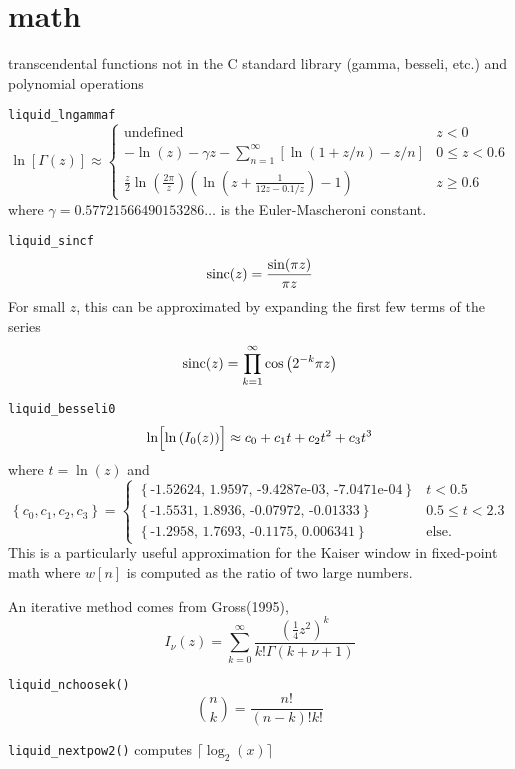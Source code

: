 % 
%

\section{math}
\label{module:math}
transcendental functions not in the C standard library (gamma, besseli, etc.)
and polynomial operations

{\tt liquid\_lngammaf}
\[
    \ln\left[ \Gamma(z) \right] \approx
    \begin{cases}
        \text{undefined}
        & z < 0 \\
        -\ln(z) - \gamma z - \sum_{n=1}^{\infty} {
            \left[ \ln(1 + z/n) -z/n\right]
        }
        & 0 \le z < 0.6 \\
        \frac{z}{2} \ln\left( \frac{2\pi}{z} \right)
        \left(
            \ln\left(z + \frac{1}{12 z - 0.1/z} \right) - 1
        \right)
        & z \ge 0.6
    \end{cases}
\]
where $\gamma=0.57721566490153286\ldots$ is the Euler-Mascheroni constant.

{\tt liquid\_sincf}
\[ \textup{sinc}(z) = \frac{\sin(\pi z)}{\pi z} \]
For small $z$, this can be approximated by expanding the first few terms of
the series
\[
    \textup{sinc}(z) = \prod_{k=1}^{\infty}{ \cos\left( 2^{-k} \pi z \right) }
\]

{\tt liquid\_besseli0}
\[
    \ln\Bigl[\ln\left(I_0(z)\right)\Bigr] \approx
    c_0 + c_1 t + c_2 t ^2 + c_3 t^3
\]
where $t=\ln(z)$ and
\[
    \left\{c_0,c_1,c_2,c_3\right\} =
    \begin{cases}
    \left\{\text{-1.52624, 1.9597, -9.4287e-03, -7.0471e-04}\right\} & t < 0.5 \\
    \left\{\text{-1.5531, 1.8936, -0.07972, -0.01333}\right\} & 0.5 \le t < 2.3 \\
    \left\{\text{-1.2958, 1.7693, -0.1175, 0.006341}\right\} & \text{else}.
    \end{cases}
\]
This is a particularly useful approximation for the Kaiser window in
fixed-point math where $w[n]$ is computed as the ratio of two large numbers.

An iterative method comes from Gross(1995),
\[
    I_\nu(z) = \sum_{k=0}^{\infty}{\frac{\left(\frac{1}{4}z^2\right)^k}{k!\Gamma(k+\nu+1)}}
\]

{\tt liquid\_nchoosek()}
\[
    {n \choose k} = \frac{n!}{(n-k)!k!}
\]

{\tt liquid\_nextpow2()} computes $\lceil \log_2(x) \rceil$

